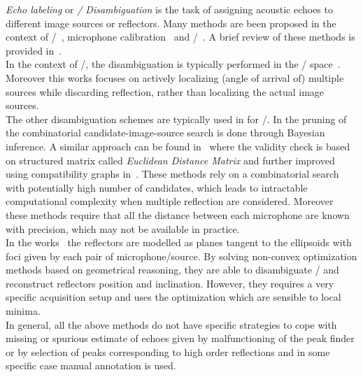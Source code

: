 \textit{Echo labeling} or \textit{\TOAs/ Disambiguation} is the task of assigning acoustic echoes to different image sources or reflectors.
Many methods are been proposed in the context of \SSL/~, microphone calibration~
and \RooGE/~.
A brief review of these methods is provided in~.
\\In the context of \SSL/, the disambiguation is typically performed in the \TDOAs/ space~.
Moreover this works focuses on actively localizing (angle of arrival of) multiple sources while discarding reflection, rather than localizing the actual image sources.
\\The other disambiguation schemes are typically used in for \RooGE/.
In  the pruning of the combinatorial candidate-image-source search is done through Bayesian inference.
A similar approach can be found in~ where the validity check is based on structured matrix called \textit{Euclidean Distance Matrix} and further improved using compatibility graphs in~.
These methods rely on a combinatorial search with potentially high number of candidates, which leads to intractable computational complexity when multiple reflection are considered.
Moreover these methods require that all the distance between each microphone are known with precision, which may not be available in practice.
\\In the works~ the reflectors are modelled as planes tangent to the ellipsoids with foci given by each pair of microphone/source.
By solving non-convex optimization methods based on geometrical reasoning, they are able to disambiguate \TOAs/ and reconstruct reflectors position and inclination.
However, they requires a very specific acquisition setup and uses the optimization which are sensible to local minima.
\\In general, all the above methods do not have specific strategies to cope with missing or spurious estimate of echoes given by malfunctioning of the peak finder or by selection of peaks corresponding to high order reflections and in some specific case manual annotation is used.
